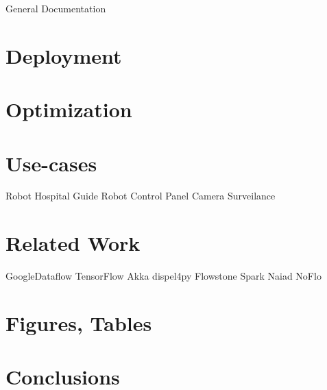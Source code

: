 \documentclass[a4]{report}
\begin{document}
General Documentation

\chapter{Deployment}


\chapter{Optimization}



\chapter{Use-cases}

Robot Hospital Guide
Robot Control Panel
Camera Surveilance


\chapter{Related Work}

GoogleDataflow
TensorFlow
Akka
dispel4py
Flowstone
Spark
Naiad
NoFlo


\chapter{Figures, Tables}


\chapter{Conclusions}





\end{document}
